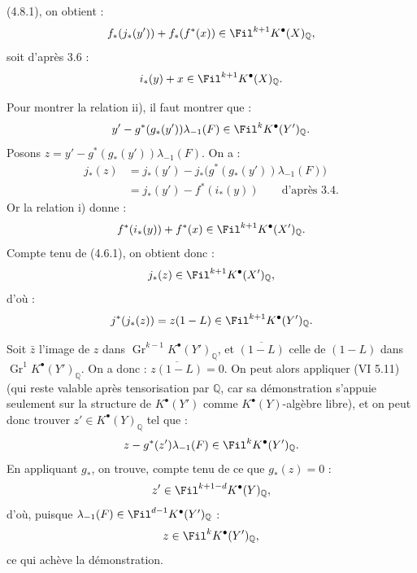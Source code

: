 
(4.8.1), on obtient :
\[
  f_*(j_*(y'))+f_*(f^*(x))\in\Fil^{k+1}K^{\bullet}(X)_{\mathbb Q},
\]
soit d'après 3.6 :
\[
  i_*(y)+x\in\Fil^{k+1}K^{\bullet}(X)_{\mathbb Q}.
\]

Pour montrer la relation ii), il faut montrer que :
\[
  y'-g^*(g_*(y'))\lambda_{-1}(F)\in\Fil^kK^{\bullet}(Y')_{\mathbb Q}.
\]
Posons \(z=y'-g^*(g_*(y'))\lambda_{-1}(F)\). On a :
\[
\begin{aligned}
j_*(z)
  &=j_*(y')-j_*\bigl(g^*(g_*(y'))\lambda_{-1}(F)\bigr)\\
  &=j_*(y')-f^*(i_*(y))\qquad\text{d'après 3.4.}
\end{aligned}
\]
Or la relation i) donne :
\[
  f^*(i_*(y))+f^*(x)\in\Fil^{k+1}K^{\bullet}(X')_{\mathbb Q}.
\]
Compte tenu de (4.6.1), on obtient donc :
\[
  j_*(z)\in\Fil^{k+1}K^{\bullet}(X')_{\mathbb Q},
\]
d'où :
\[
  j^*(j_*(z))=z(1-L)\in\Fil^{k+1}K^{\bullet}(Y')_{\mathbb Q}.
\]

Soit \(\bar z\) l'image de \(z\) dans \(\operatorname{Gr}^{k-1}K^{\bullet}(Y')_{\mathbb Q}\), et \(\overline{(1-L)}\) celle de \((1-L)\) dans \(\operatorname{Gr}^{1}K^{\bullet}(Y')_{\mathbb Q}\). On a donc : \(\overline{z(1-L)}=0\). On peut alors appliquer (VI 5.11) (qui reste valable après tensorisation par \(\mathbb Q\), car sa démonstration s'appuie seulement sur la structure de \(K^{\bullet}(Y')\) comme \(K^{\bullet}(Y)\)-algèbre libre), et on peut donc trouver \(z'\in K^{\bullet}(Y)_{\mathbb Q}\) tel que :
\[
  z-g^*(z')\lambda_{-1}(F)\in\Fil^kK^{\bullet}(Y')_{\mathbb Q}.
\]
En appliquant \(g_*\), on trouve, compte tenu de ce que \(g_*(z)=0\) :
\[
  z'\in\Fil^{k+1-d}K^{\bullet}(Y)_{\mathbb Q},
\]
d'où, puisque \(\lambda_{-1}(F)\in\Fil^{d-1}K^{\bullet}(Y')_{\mathbb Q}\) :
\[
  z\in\Fil^kK^{\bullet}(Y')_{\mathbb Q},
\]
ce qui achève la démonstration.

